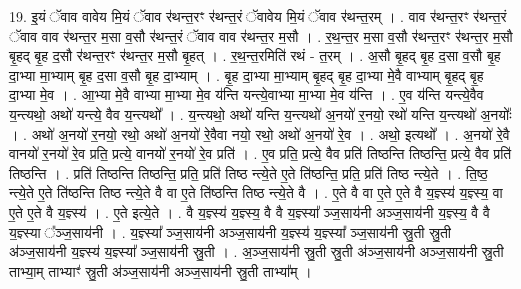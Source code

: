 \documentclass[17pt]{extarticle}
\begin{document}
19. इ॒यं ॅवाव वावेय मि॒यं ॅवाव र॑थन्त॒रꣳ र॑थन्त॒रं ॅवावेय मि॒यं ॅवाव र॑थन्त॒रम् । . वाव र॑थन्त॒रꣳ र॑थन्त॒रं ॅवाव वाव र॑थन्त॒र म॒सा व॒सौ र॑थन्त॒रं ॅवाव वाव र॑थन्त॒र म॒सौ । . र॒थ॒न्त॒र म॒सा व॒सौ र॑थन्त॒रꣳ र॑थन्त॒र म॒सौ बृ॒हद् बृ॒ह द॒सौ र॑थन्त॒रꣳ र॑थन्त॒र म॒सौ बृ॒हत् । . र॒थ॒न्त॒रमिति॑ रथं - त॒रम् । . अ॒सौ बृ॒हद् बृ॒ह द॒सा व॒सौ बृ॒ह दा॒भ्या मा॒भ्याम् बृ॒ह द॒सा व॒सौ बृ॒ह दा॒भ्याम् । . बृ॒ह दा॒भ्या मा॒भ्याम् बृ॒हद् बृ॒ह दा॒भ्या मे॒वै वाभ्याम् बृ॒हद् बृ॒ह दा॒भ्या मे॒व । . आ॒भ्या मे॒वै वाभ्या मा॒भ्या मे॒व य॑न्ति यन्त्ये॒वाभ्या मा॒भ्या मे॒व य॑न्ति । . ए॒व य॑न्ति यन्त्ये॒वैव य॒न्त्यथो॒ अथो॑ यन्त्ये॒ वैव य॒न्त्यथो᳚ । . य॒न्त्यथो॒ अथो॑ यन्ति य॒न्त्यथो॑ अ॒नयो॑ र॒नयो॒ रथो॑ यन्ति य॒न्त्यथो॑ अ॒नयोः᳚ । . अथो॑ अ॒नयो॑ र॒नयो॒ रथो॒ अथो॑ अ॒नयो॑ रे॒वैवा नयो॒ रथो॒ अथो॑ अ॒नयो॑ रे॒व । . अथो॒ इत्यथो᳚ । . अ॒नयो॑ रे॒वै वानयो॑ र॒नयो॑ रे॒व प्रति॒ प्रत्ये॒ वानयो॑ र॒नयो॑ रे॒व प्रति॑ । . ए॒व प्रति॒ प्रत्ये॒ वैव प्रति॑ तिष्ठन्ति तिष्ठन्ति॒ प्रत्ये॒ वैव प्रति॑ तिष्ठन्ति । . प्रति॑ तिष्ठन्ति तिष्ठन्ति॒ प्रति॒ प्रति॑ तिष्ठ न्त्ये॒ते ए॒ते ति॑ष्ठन्ति॒ प्रति॒ प्रति॑ तिष्ठ न्त्ये॒ते । . ति॒ष्ठ॒ न्त्ये॒ते ए॒ते ति॑ष्ठन्ति तिष्ठ न्त्ये॒ते वै वा ए॒ते ति॑ष्ठन्ति तिष्ठ न्त्ये॒ते वै । . ए॒ते वै वा ए॒ते ए॒ते वै य॒ज्ञ्स्य॑ य॒ज्ञ्स्य॒ वा ए॒ते ए॒ते वै य॒ज्ञ्स्य॑ । . ए॒ते इत्ये॒ते । . वै य॒ज्ञ्स्य॑ य॒ज्ञ्स्य॒ वै वै य॒ज्ञ्स्या᳚ ञ्ज॒साय॑नी अञ्ज॒साय॑नी य॒ज्ञ्स्य॒ वै वै य॒ज्ञ्स्या ᳚ञ्ज॒साय॑नी । . य॒ज्ञ्स्या᳚ ञ्ज॒साय॑नी अञ्ज॒साय॑नी य॒ज्ञ्स्य॑ य॒ज्ञ्स्या᳚ ञ्ज॒साय॑नी स्रु॒ती स्रु॒ती अ॑ञ्ज॒साय॑नी य॒ज्ञ्स्य॑ य॒ज्ञ्स्या᳚ ञ्ज॒साय॑नी स्रु॒ती । . अ॒ञ्ज॒साय॑नी स्रु॒ती स्रु॒ती अ॑ञ्ज॒साय॑नी अञ्ज॒साय॑नी स्रु॒ती ताभ्या॒म् ताभ्याꣳ॑ स्रु॒ती अ॑ञ्ज॒साय॑नी अञ्ज॒साय॑नी स्रु॒ती ताभ्या᳚म् । \newline
\end{document}
